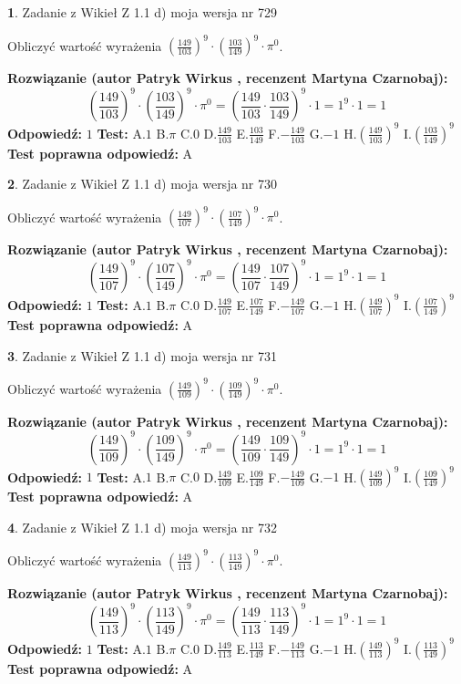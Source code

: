 \documentclass[12pt, a4paper]{article}
\theoremstyle{definition} %
\newtheorem{zad}{}
\newcommand{\zadStart}[1]{\begin{zad}#1\newline}
\newcommand{\zadStop}{\end{zad}}
\newcommand{\rozwStart}[2]{\noindent \textbf{Rozwiązanie (autor #1 , recenzent #2): }\newline}
\newcommand{\rozwStop}{\newline}
\newcommand{\odpStart}{\noindent \textbf{Odpowiedź:}\newline}
\newcommand{\odpStop}{\newline}
\newcommand{\testStart}{\noindent \textbf{Test:}\newline}
\newcommand{\testStop}{\newline}
\newcommand{\kluczStart}{\noindent \textbf{Test poprawna odpowiedź:}\newline}
\newcommand{\kluczStop}{\newline}
\begin{document}
\zadStart{Zadanie z Wikieł Z 1.1 d) moja wersja nr 729}

Obliczyć wartość wyrażenia $(\frac{149}{103})^{9} \cdot (\frac{103}{149})^{9} \cdot \pi^{0}$.
\zadStop
\rozwStart{Patryk Wirkus}{Martyna Czarnobaj}
$$(\frac{149}{103})^{9} \cdot (\frac{103}{149})^{9} \cdot \pi^{0} = (\frac{149}{103} \cdot \frac{103}{149})^{9} \cdot 1 = 1^{9} \cdot 1 = 1$$
\rozwStop
\odpStart
$1$
\odpStop
\testStart
A.$1$ B.$\pi$ C.$0$ D.$\frac{149}{103}$ E.$\frac{103}{149}$
F.$-\frac{149}{103}$ G.$-1$
H.$(\frac{149}{103})^{9}$
I.$(\frac{103}{149})^{9}$
\testStop
\kluczStart
A
\kluczStop



\zadStart{Zadanie z Wikieł Z 1.1 d) moja wersja nr 730}

Obliczyć wartość wyrażenia $(\frac{149}{107})^{9} \cdot (\frac{107}{149})^{9} \cdot \pi^{0}$.
\zadStop
\rozwStart{Patryk Wirkus}{Martyna Czarnobaj}
$$(\frac{149}{107})^{9} \cdot (\frac{107}{149})^{9} \cdot \pi^{0} = (\frac{149}{107} \cdot \frac{107}{149})^{9} \cdot 1 = 1^{9} \cdot 1 = 1$$
\rozwStop
\odpStart
$1$
\odpStop
\testStart
A.$1$ B.$\pi$ C.$0$ D.$\frac{149}{107}$ E.$\frac{107}{149}$
F.$-\frac{149}{107}$ G.$-1$
H.$(\frac{149}{107})^{9}$
I.$(\frac{107}{149})^{9}$
\testStop
\kluczStart
A
\kluczStop



\zadStart{Zadanie z Wikieł Z 1.1 d) moja wersja nr 731}

Obliczyć wartość wyrażenia $(\frac{149}{109})^{9} \cdot (\frac{109}{149})^{9} \cdot \pi^{0}$.
\zadStop
\rozwStart{Patryk Wirkus}{Martyna Czarnobaj}
$$(\frac{149}{109})^{9} \cdot (\frac{109}{149})^{9} \cdot \pi^{0} = (\frac{149}{109} \cdot \frac{109}{149})^{9} \cdot 1 = 1^{9} \cdot 1 = 1$$
\rozwStop
\odpStart
$1$
\odpStop
\testStart
A.$1$ B.$\pi$ C.$0$ D.$\frac{149}{109}$ E.$\frac{109}{149}$
F.$-\frac{149}{109}$ G.$-1$
H.$(\frac{149}{109})^{9}$
I.$(\frac{109}{149})^{9}$
\testStop
\kluczStart
A
\kluczStop



\zadStart{Zadanie z Wikieł Z 1.1 d) moja wersja nr 732}

Obliczyć wartość wyrażenia $(\frac{149}{113})^{9} \cdot (\frac{113}{149})^{9} \cdot \pi^{0}$.
\zadStop
\rozwStart{Patryk Wirkus}{Martyna Czarnobaj}
$$(\frac{149}{113})^{9} \cdot (\frac{113}{149})^{9} \cdot \pi^{0} = (\frac{149}{113} \cdot \frac{113}{149})^{9} \cdot 1 = 1^{9} \cdot 1 = 1$$
\rozwStop
\odpStart
$1$
\odpStop
\testStart
A.$1$ B.$\pi$ C.$0$ D.$\frac{149}{113}$ E.$\frac{113}{149}$
F.$-\frac{149}{113}$ G.$-1$
H.$(\frac{149}{113})^{9}$
I.$(\frac{113}{149})^{9}$
\testStop
\kluczStart
A
\kluczStop
\end{document}
